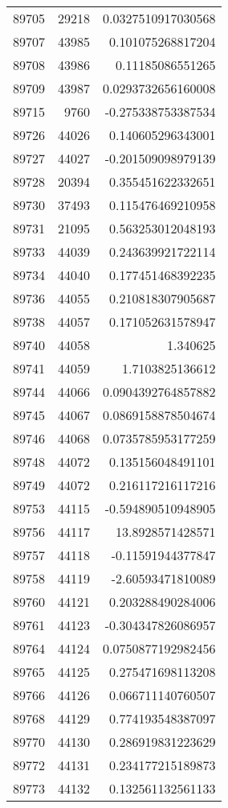 \begin{tabular}{r | r | r}
89705 & 29218 & 0.0327510917030568 \\
89707 & 43985 & 0.101075268817204 \\
89708 & 43986 & 0.11185086551265 \\
89709 & 43987 & 0.0293732656160008 \\
89715 & 9760 & -0.275338753387534 \\
89726 & 44026 & 0.140605296343001 \\
89727 & 44027 & -0.201509098979139 \\
89728 & 20394 & 0.355451622332651 \\
89730 & 37493 & 0.115476469210958 \\
89731 & 21095 & 0.563253012048193 \\
89733 & 44039 & 0.243639921722114 \\
89734 & 44040 & 0.177451468392235 \\
89736 & 44055 & 0.210818307905687 \\
89738 & 44057 & 0.171052631578947 \\
89740 & 44058 & 1.340625 \\
89741 & 44059 & 1.7103825136612 \\
89744 & 44066 & 0.0904392764857882 \\
89745 & 44067 & 0.0869158878504674 \\
89746 & 44068 & 0.0735785953177259 \\
89748 & 44072 & 0.135156048491101 \\
89749 & 44072 & 0.216117216117216 \\
89753 & 44115 & -0.594890510948905 \\
89756 & 44117 & 13.8928571428571 \\
89757 & 44118 & -0.11591944377847 \\
89758 & 44119 & -2.60593471810089 \\
89760 & 44121 & 0.203288490284006 \\
89761 & 44123 & -0.304347826086957 \\
89764 & 44124 & 0.0750877192982456 \\
89765 & 44125 & 0.275471698113208 \\
89766 & 44126 & 0.066711140760507 \\
89768 & 44129 & 0.774193548387097 \\
89770 & 44130 & 0.286919831223629 \\
89772 & 44131 & 0.234177215189873 \\
89773 & 44132 & 0.132561132561133 \\

\end{tabular}
